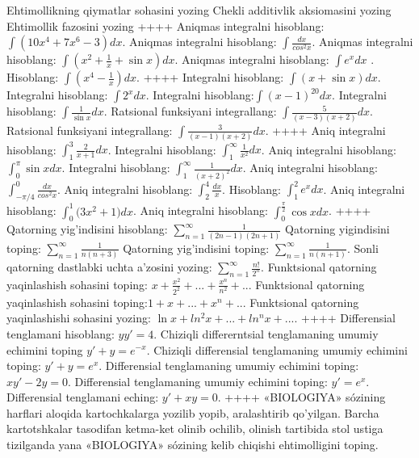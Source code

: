Ehtimollikning qiymatlar sohasini yozing
Chekli additivlik aksiomasini yozing
Ehtimollik fazosini yozing
++++
Aniqmas integralni hisoblang: \(\int {\left( 10x^{4} + 7x^{6} - 3 \right)dx}\).
Aniqmas integralni hisoblang: \(\int \frac{dx}{cos^{2}x}\).
Aniqmas integralni hisoblang: \(\int {\left( x^{2} + \frac{1}{x} + \sin x \right)dx}\).
Aniqmas integralni hisoblang: \(\int {e^{x}dx}\) .
Hisoblang: \(\int \left( x^{4} - \frac{1}{x} \right)dx\).
++++
Integralni hisoblang: \(\int {(x + \sin x)dx}\).
Integralni hisoblang: \(\int {2^{x}dx}\).
Integralni hisoblang:\(\int {(x - 1)^{20}}dx\).
Integralni hisoblang: \(\int {\frac{1}{\sin x}dx}\).
Ratsional funksiyani integrallang: \(\int {\frac{5}{(x - 3)(x + 2)}dx}\).
Ratsional funksiyani integrallang: \(\int {\frac{3}{(x - 1)(x + 2)}dx}\).
++++
Aniq integralni hisoblang: \(\int_{1}^{3}\frac{2}{x + 1}dx\).
Integralni hisoblang: \(\int_{1}^{\infty}{\frac{1}{x^{2}}dx}\).
Aniq integralni hisoblang: \(\int_{0}^{\pi}{\sin xdx}\).
Integralni hisoblang: \(\int_{1}^{\infty}{\frac{1}{(x + 2)^{2}}dx}\).
Aniq integralni hisoblang: \(\int_{- \pi/4}^{0}\frac{dx}{cos^{2}x}\).
Aniq integralni hisoblang: \(\int_{2}^{4}\frac{dx}{x}\).
Hisoblang: \(\int_{1}^{2}{e^{x}dx}\).
Aniq integralni hisoblang: \(\int_{0}^{1}{(3x^{2}} + 1)dx\).
Aniq integralni hisoblang: \(\int_{0}^{\frac{\pi}{2}}{\cos xdx}\).
++++
Qatorning yig'indisini hisoblang: \(\sum_{n = 1}^{\infty}\frac{1}{(2n - 1)(2n + 1)}\)
Qatorning yigindisini toping: \(\sum_{n = 1}^{\infty}\frac{1}{n(n + 3)}\)
Qatorning yig'indisini toping: \(\sum_{n = 1}^{\infty}\frac{1}{n(n + 1)}\).
Sonli qatorning dastlabki uchta a'zosini yozing: \(\sum_{n = 1}^{\infty}\frac{n!}{2^{n}}\).
Funktsional qatorning yaqinlashish sohasini toping: \(x + \frac{x^{2}}{2^{2}} + ... + \frac{x^{n}}{n^{2}} + ...\)
Funktsional qatorning yaqinlashish sohasini toping:\(1 + x + ... + x^{n} + ...\)
Funktsional qatorning yaqinlashishi sohasini yozing: \(\ln x + ln^{2}x + ... + ln^{n}x + ...\).
++++
Differensial tenglamani hisoblang: \(yy' = 4\).
Chiziqli differerntsial tenglamaning umumiy echimini toping \(y' + y = e^{- x}\).
Chiziqli differensial tenglamaning umumiy echimini toping: \(y' + y = e^{x}\).
Differensial tenglamaning umumiy echimini toping: \(xy' - 2y = 0\).
Differensial tenglamaning umumiy echimini toping: \(y' = e^{x}\).
Differensial tenglamani eching: \(y' + xy = 0\).
++++
«BIOLOGIYA» sózining harflari aloqida kartochkalarga yozilib yopib, aralashtirib qo'yilgan. Barcha kartotshkalar tasodifan ketma-ket olinib ochilib, olinish tartibida stol ustiga tizilganda yana «BIOLOGIYA» sózining kelib chiqishi ehtimolligini toping.
